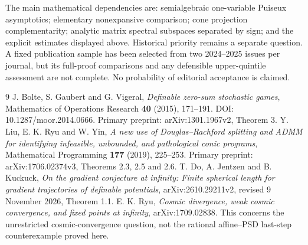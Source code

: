 \documentclass[11pt]{article}
\theoremstyle{remark}\newtheorem{remark}[theorem]{Remark}
\numberwithin{equation}{section}
\begin{document}
The main mathematical dependencies are: semialgebraic one-variable Puiseux asymptotics; elementary nonexpansive comparison; cone projection complementarity; analytic matrix spectral subspaces separated by sign; and the explicit estimates displayed above. Historical priority remains a separate question. A fixed publication sample has been selected from two 2024--2025 issues per journal, but its full-proof comparisons and any defensible upper-quintile assessment are not complete. No probability of editorial acceptance is claimed.

\begin{thebibliography}{9}
 J. Bolte, S. Gaubert and G. Vigeral, \emph{Definable zero-sum stochastic games}, Mathematics of Operations Research \textbf{40} (2015), 171--191. DOI: 10.1287/moor.2014.0666. Primary preprint: arXiv:1301.1967v2, Theorem 3.
 Y. Liu, E. K. Ryu and W. Yin, \emph{A new use of Douglas--Rachford splitting and ADMM for identifying infeasible, unbounded, and pathological conic programs}, Mathematical Programming \textbf{177} (2019), 225--253. Primary preprint: arXiv:1706.02374v3, Theorems 2.3, 2.5 and 2.6.
 T. Do, A. Jentzen and B. Kuckuck, \emph{On the gradient conjecture at infinity: Finite spherical length for gradient trajectories of definable potentials}, arXiv:2610.29211v2, revised 9 November 2026, Theorem 1.1.
 E. K. Ryu, \emph{Cosmic divergence, weak cosmic convergence, and fixed points at infinity}, arXiv:1709.02838. This concerns the unrestricted cosmic-convergence question, not the rational affine--PSD last-step counterexample proved here.
\end{thebibliography}
\end{document}
